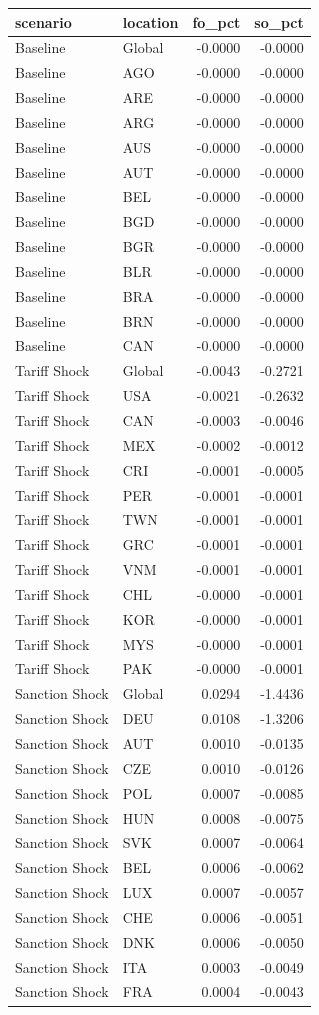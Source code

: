 \begin{tabular}{llrr}
\toprule
scenario & location & fo_pct & so_pct \\
\midrule
Baseline & Global & -0.0000 & -0.0000 \\
Baseline & AGO & -0.0000 & -0.0000 \\
Baseline & ARE & -0.0000 & -0.0000 \\
Baseline & ARG & -0.0000 & -0.0000 \\
Baseline & AUS & -0.0000 & -0.0000 \\
Baseline & AUT & -0.0000 & -0.0000 \\
Baseline & BEL & -0.0000 & -0.0000 \\
Baseline & BGD & -0.0000 & -0.0000 \\
Baseline & BGR & -0.0000 & -0.0000 \\
Baseline & BLR & -0.0000 & -0.0000 \\
Baseline & BRA & -0.0000 & -0.0000 \\
Baseline & BRN & -0.0000 & -0.0000 \\
Baseline & CAN & -0.0000 & -0.0000 \\
Tariff Shock & Global & -0.0043 & -0.2721 \\
Tariff Shock & USA & -0.0021 & -0.2632 \\
Tariff Shock & CAN & -0.0003 & -0.0046 \\
Tariff Shock & MEX & -0.0002 & -0.0012 \\
Tariff Shock & CRI & -0.0001 & -0.0005 \\
Tariff Shock & PER & -0.0001 & -0.0001 \\
Tariff Shock & TWN & -0.0001 & -0.0001 \\
Tariff Shock & GRC & -0.0001 & -0.0001 \\
Tariff Shock & VNM & -0.0001 & -0.0001 \\
Tariff Shock & CHL & -0.0000 & -0.0001 \\
Tariff Shock & KOR & -0.0000 & -0.0001 \\
Tariff Shock & MYS & -0.0000 & -0.0001 \\
Tariff Shock & PAK & -0.0000 & -0.0001 \\
Sanction Shock & Global & 0.0294 & -1.4436 \\
Sanction Shock & DEU & 0.0108 & -1.3206 \\
Sanction Shock & AUT & 0.0010 & -0.0135 \\
Sanction Shock & CZE & 0.0010 & -0.0126 \\
Sanction Shock & POL & 0.0007 & -0.0085 \\
Sanction Shock & HUN & 0.0008 & -0.0075 \\
Sanction Shock & SVK & 0.0007 & -0.0064 \\
Sanction Shock & BEL & 0.0006 & -0.0062 \\
Sanction Shock & LUX & 0.0007 & -0.0057 \\
Sanction Shock & CHE & 0.0006 & -0.0051 \\
Sanction Shock & DNK & 0.0006 & -0.0050 \\
Sanction Shock & ITA & 0.0003 & -0.0049 \\
Sanction Shock & FRA & 0.0004 & -0.0043 \\
\bottomrule
\end{tabular}
